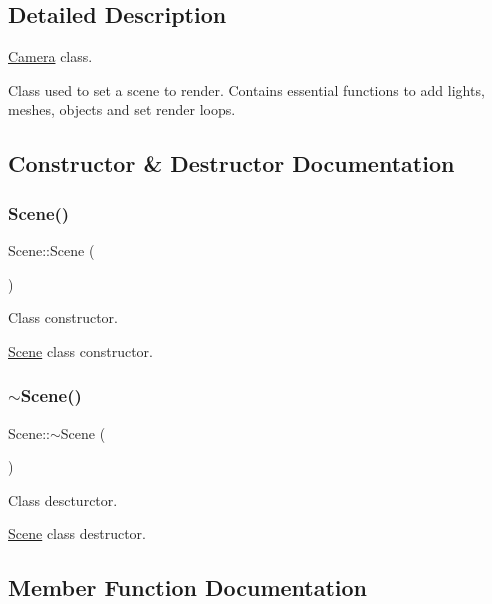 \subsection{Detailed Description}
\hyperlink{class_camera}{Camera} class. 

Class used to set a scene to render. Contains essential functions to add lights, meshes, objects and set render loops. 

\subsection{Constructor \& Destructor Documentation}
\mbox{\label{class_scene_ad10176d75a9cc0da56626f682d083507}} 
\subsubsection{\texorpdfstring{Scene()}{Scene()}}
{\footnotesize\ttfamily Scene\+::\+Scene (\begin{DoxyParamCaption}{ }\end{DoxyParamCaption})}



Class constructor. 

\hyperlink{class_scene}{Scene} class constructor. \mbox{\label{class_scene_a3b8cec2e32546713915f8c6303c951f1}} 
\subsubsection{\texorpdfstring{$\sim$\+Scene()}{~Scene()}}
{\footnotesize\ttfamily Scene\+::$\sim$\+Scene (\begin{DoxyParamCaption}{ }\end{DoxyParamCaption})}



Class descturctor. 

\hyperlink{class_scene}{Scene} class destructor. 

\subsection{Member Function Documentation}
\mbox{\label{class_scene_a8ba56754e230d7a99736c5232bd912ea}} 
